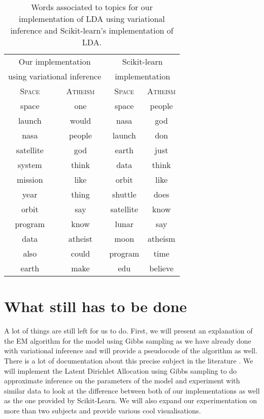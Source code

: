 \documentclass{article}
\begin{document}
\begin{table}[htp]
\caption{\label{tab:top_words} Words associated to topics for our implementation of LDA using variational inference and Scikit-learn's implementation of LDA.}
\vskip 0.15in
\begin{center}
\begin{small}
\begin{tabular}{c|c|c|c}
\multicolumn{2}{c|}{Our implementation} & \multicolumn{2}{c}{Scikit-learn} \\
\multicolumn{2}{c|}{using variational inference} & \multicolumn{2}{c}{implementation} \\
\hline 
\textsc{Space} & \textsc{Atheism} & \textsc{Space} & \textsc{Atheism} \\
\hline 
space & one & space & people \\
launch & would & nasa & god \\
nasa & people & launch & don \\
satellite & god & earth & just \\
system & think & data & think \\
mission & like & orbit & like \\
year & thing & shuttle & does \\
orbit & say & satellite & know \\
program & know & lunar & say \\
data & atheist & moon & atheism \\
also & could & program & time \\
earth & make & edu & believe

\end{tabular}
\end{small}
\end{center}
\label{default}
\end{table}%

\section{What still has to be done}

A lot of things are still left for us to do. First, we will present an explanation of the EM algorithm for the model using Gibbs sampling as we have already done with variational inference and will provide a pseudocode of the algorithm as well. There is a lot of documentation about this precise subject in the literature \cite{griffiths2002gibbs}\cite{darling2011theoretical}\cite{heinrich2005parameter}. We will implement the Latent Dirichlet Allocation using Gibbs sampling to do approximate inference on the parameters of the model and experiment with similar data to look at the difference between both of our implementations as well as the one provided by Scikit-Learn. We will also expand our experimentation on more than two subjects and provide various cool visualisations.




\end{document}
